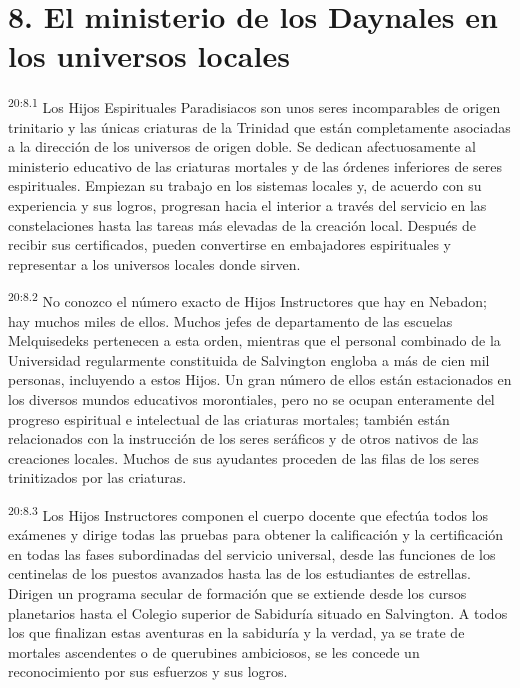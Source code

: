 \section*{8. El ministerio de los Daynales en los universos locales}
\par
\textsuperscript{20:8.1} Los Hijos Espirituales Paradisiacos son unos seres incomparables de origen trinitario y las únicas criaturas de la Trinidad que están completamente asociadas a la dirección de los universos de origen doble. Se dedican afectuosamente al ministerio educativo de las criaturas mortales y de las órdenes inferiores de seres espirituales. Empiezan su trabajo en los sistemas locales y, de acuerdo con su experiencia y sus logros, progresan hacia el interior a través del servicio en las constelaciones hasta las tareas más elevadas de la creación local. Después de recibir sus certificados, pueden convertirse en embajadores espirituales y representar a los universos locales donde sirven.

\par
\textsuperscript{20:8.2} No conozco el número exacto de Hijos Instructores que hay en Nebadon; hay muchos miles de ellos. Muchos jefes de departamento de las escuelas Melquisedeks pertenecen a esta orden, mientras que el personal combinado de la Universidad regularmente constituida de Salvington engloba a más de cien mil personas, incluyendo a estos Hijos. Un gran número de ellos están estacionados en los diversos mundos educativos morontiales, pero no se ocupan enteramente del progreso espiritual e intelectual de las criaturas mortales; también están relacionados con la instrucción de los seres seráficos y de otros nativos de las creaciones locales. Muchos de sus ayudantes proceden de las filas de los seres trinitizados por las criaturas.

\par
\textsuperscript{20:8.3} Los Hijos Instructores componen el cuerpo docente que efectúa todos los exámenes y dirige todas las pruebas para obtener la calificación y la certificación en todas las fases subordinadas del servicio universal, desde las funciones de los centinelas de los puestos avanzados hasta las de los estudiantes de estrellas. Dirigen un programa secular de formación que se extiende desde los cursos planetarios hasta el Colegio superior de Sabiduría situado en Salvington. A todos los que finalizan estas aventuras en la sabiduría y la verdad, ya se trate de mortales ascendentes o de querubines ambiciosos, se les concede un reconocimiento por sus esfuerzos y sus logros.

